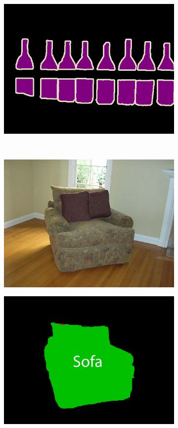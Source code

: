 \documentclass{article} %
\begin{document}
\begin{figure}[b]
\begin{subfigure}[b]{0.15\linewidth}
    \includegraphics[width=\textwidth]{figs/ab/gt/2009_005302}
  \end{subfigure}
  ~
  \begin{subfigure}[b]{0.15\linewidth}
    \includegraphics[width=\textwidth]{figs/ab/img/2008_004612}
  \end{subfigure}
  \begin{subfigure}[b]{0.15\linewidth}
    \includegraphics[width=\textwidth]{figs/ab/crf/2008_004612}

\end{subfigure}
\end{figure}
\end{document}
